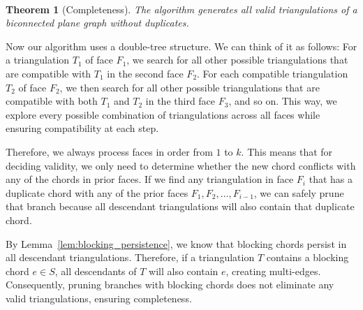 ﻿﻿\documentclass[12pt,a4paper]{article}
\newtheorem{theorem}{Theorem}
\theoremstyle{definition}
\theoremstyle{remark}
\begin{document}
\begin{theorem}[Completeness]
	\label{thm:completeness}
	The algorithm generates all valid triangulations of a biconnected plane graph without duplicates.
\end{theorem}

Now our algorithm uses a double-tree structure. We can think of it as follows: For a triangulation $T_1$ of face $F_1$, we search for all other possible triangulations that are compatible with $T_1$ in the second face $F_2$. For each compatible triangulation $T_2$ of face $F_2$, we then search for all other possible triangulations that are compatible with both $T_1$ and $T_2$ in the third face $F_3$, and so on. This way, we explore every possible combination of triangulations across all faces while ensuring compatibility at each step.

Therefore, we always process faces in order from $1$ to $k$.
This means that for deciding validity, we only need to determine whether the new chord conflicts with any of the chords in prior faces. If we find any triangulation in face $F_i$ that has a duplicate chord with any of the prior faces $F_1, F_2, \ldots, F_{i-1}$, we can safely prune that branch because all descendant triangulations will also contain that duplicate chord.

By Lemma~\ref{lem:blocking_persistence}, we know that blocking chords persist in all descendant triangulations. Therefore, if a triangulation $T$ contains a blocking chord $e \in S$, all descendants of $T$ will also contain $e$, creating multi-edges. Consequently, pruning branches with blocking chords does not eliminate any valid triangulations, ensuring completeness.
\end{document}
